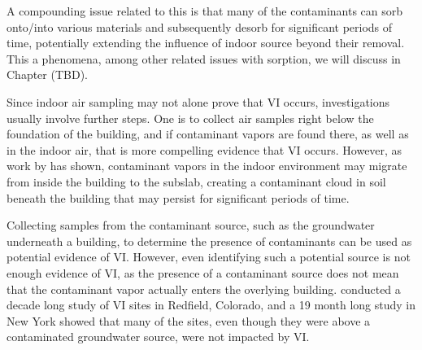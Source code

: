 A compounding issue related to this is that many of the contaminants can sorb onto/into various materials and subsequently desorb for significant periods of time, potentially extending the influence of indoor source beyond their removal\cite{meininghaus_diffusion_2000,meininghaus_diffusion_2002}.
This a phenomena, among other related issues with sorption, we will discuss in Chapter (TBD).\par %

Since indoor air sampling may not alone prove that VI occurs, investigations usually involve further steps.
One is to collect air samples right below the foundation of the building, and if contaminant vapors are found there, as well as in the indoor air, that is more compelling evidence that VI occurs.
However, as work by \citeauthor{holton_creation_2018}\cite{holton_creation_2018} has shown, contaminant vapors in the indoor environment may migrate from inside the building to the subslab, creating a contaminant cloud in soil beneath the building that may persist for significant periods of time.\par

Collecting samples from the contaminant source, such as the groundwater underneath a building, to determine the presence of contaminants can be used as potential evidence of VI.
However, even identifying such a potential source is not enough evidence of VI, as the presence of a contaminant source does not mean that the contaminant vapor actually enters the overlying building.
\citeauthor{folkes_observed_2009}\cite{folkes_observed_2009} conducted a decade long study of VI sites in Redfield, Colorado, and a 19 month long study in New York showed that many of the sites, even though they were above a contaminated groundwater source, were not impacted by VI.\par

